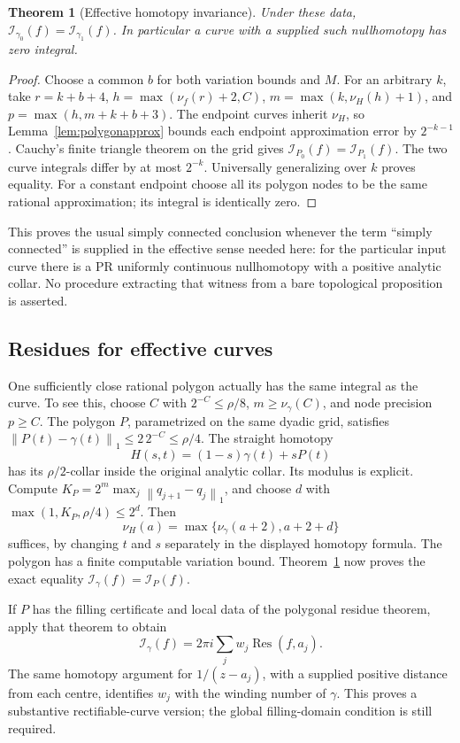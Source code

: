 \documentclass[11pt]{article}
\newtheorem{theorem}{Theorem}[section]
\theoremstyle{definition}
\newcommand{\norm}[1]{\left\lVert#1\right\rVert_1}
\newcommand{\Res}{\operatorname{Res}}
\newcommand{\Int}{\mathcal I}
\begin{document}
\begin{theorem}[Effective homotopy invariance]\label{thm:homotopy}
Under these data,
\(\Int_{\gamma_0}(f)=\Int_{\gamma_1}(f)\).
In particular a curve with a supplied such nullhomotopy has zero
integral.
\end{theorem}
\begin{proof}
Choose a common \(b\) for both variation bounds and \(M\). For an
arbitrary \(k\), take \(r=k+b+4\),
\(h=\max(\nu_f(r)+2,C)\),
\(m=\max(k,\nu_H(h)+1)\), and
\(p=\max(h,m+k+b+3)\).
The endpoint curves inherit \(\nu_H\), so
Lemma~\ref{lem:polygonapprox} bounds each endpoint approximation error
by \(2^{-k-1}\). Cauchy's finite triangle theorem on the grid gives
\(\Int_{P_0}(f)=\Int_{P_1}(f)\). The two curve integrals differ by at
most \(2^{-k}\). Universally generalizing over \(k\) proves equality.
For a constant endpoint choose all its polygon nodes to be the same
rational approximation; its integral is identically zero.
\end{proof}

This proves the usual simply connected conclusion whenever the term
``simply connected'' is supplied in the effective sense needed here:
for the particular input curve there is a PR uniformly continuous
nullhomotopy with a positive analytic collar. No procedure extracting
that witness from a bare topological proposition is asserted.

\subsection{Residues for effective curves}

One sufficiently close rational polygon actually has the same integral
as the curve. To see this, choose \(C\) with \(2^{-C}\le\rho/8\),
\(m\ge\nu_\gamma(C)\), and node precision \(p\ge C\).
The polygon \(P\), parametrized on the same dyadic grid, satisfies
\(\norm{P(t)-\gamma(t)}\le2\,2^{-C}\le\rho/4\).
The straight homotopy
\[
 H(s,t)=(1-s)\gamma(t)+sP(t)
\]
has its \(\rho/2\)-collar inside the original analytic collar.
Its modulus is explicit. Compute
\(K_P=2^m\max_j\norm{q_{j+1}-q_j}\), and choose
\(d\) with \(\max(1,K_P,\rho/4)\le2^d\).
Then
\[
 \nu_H(a)=\max\{\nu_\gamma(a+2),a+2+d\}
\]
suffices, by changing \(t\) and \(s\) separately in the displayed
homotopy formula. The polygon has a finite computable variation bound.
Theorem~\ref{thm:homotopy} now proves the exact equality
\(\Int_\gamma(f)=\Int_P(f)\).

If \(P\) has the filling certificate and local data of the polygonal
residue theorem, apply that theorem to obtain
\[
 \Int_\gamma(f)=2\pi i\sum_jw_j\Res(f,a_j).
\]
The same homotopy argument for \(1/(z-a_j)\), with a supplied positive
distance from each centre, identifies \(w_j\) with the winding number
of \(\gamma\). This proves a substantive rectifiable-curve version;
the global filling-domain condition is still required.
\end{document}

